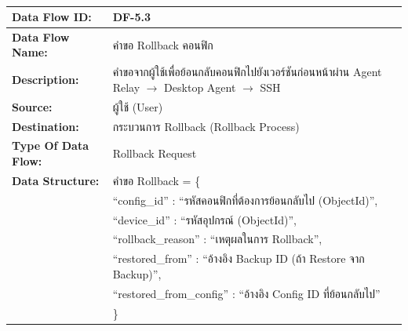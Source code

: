 \begin{table}[H]
    \caption{}
    \label{tab:df-5-3}
    \fontSixTeen 
    \begin{tabularx}{\textwidth}{|l|L|} 
        \hline
        \textbf{Data Flow ID:} & DF-5.3 \\
        \hline
        \textbf{Data Flow Name:} & คำขอ Rollback คอนฟิก \\
        \hline
        \textbf{Description:} & คำขอจากผู้ใช้เพื่อย้อนกลับคอนฟิกไปยังเวอร์ชันก่อนหน้าผ่าน Agent Relay $\rightarrow$ Desktop Agent $\rightarrow$ SSH \\
        \hline
        \textbf{Source:} & ผู้ใช้ (User) \\
        \hline
        \textbf{Destination:} & กระบวนการ Rollback (Rollback Process) \\
        \hline
        \textbf{Type Of Data Flow:} & Rollback Request \\
        \hline
        \textbf{Data Structure:} & คำขอ Rollback = \{ \nonumber \\
                        & \hspace{1em} ``config\_id'' : ``รหัสคอนฟิกที่ต้องการย้อนกลับไป (ObjectId)'', \nonumber \\
                        & \hspace{1em} ``device\_id'' : ``รหัสอุปกรณ์ (ObjectId)'', \nonumber \\
                        & \hspace{1em} ``rollback\_reason'' : ``เหตุผลในการ Rollback'', \nonumber \\
                        & \hspace{1em} ``restored\_from'' : ``อ้างอิง Backup ID (ถ้า Restore จาก Backup)'', \nonumber \\
                        & \hspace{1em} ``restored\_from\_config'' : ``อ้างอิง Config ID ที่ย้อนกลับไป'' \nonumber \\
                        & \} \\
        \hline
    \end{tabularx}
\end{table}

